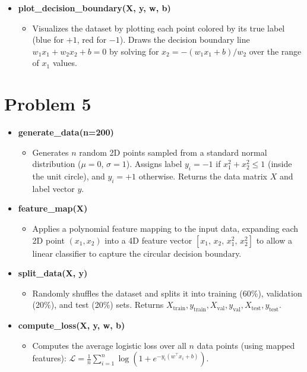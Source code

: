 \documentclass[12pt,fleqn]{article}
\begin{document}
\begin{itemize}
  \item \textbf{plot\_decision\_boundary(X, y, w, b)}
  \begin{itemize}
    \item Visualizes the dataset by plotting each point colored by its true label (blue for $+1$, red for $-1$). Draws the decision boundary line $w_1 x_1 + w_2 x_2 + b = 0$ by solving for $x_2 = -(w_1 x_1 + b)/w_2$ over the range of $x_1$ values.
  \end{itemize}
\end{itemize}

\newpage
\section*{Problem 5}

\begin{itemize}
  \item \textbf{generate\_data(n=200)}
  \begin{itemize}
    \item Generates $n$ random 2D points sampled from a standard normal distribution ($\mu=0$, $\sigma=1$). Assigns label $y_i = -1$ if $x_1^2 + x_2^2 \leq 1$ (inside the unit circle), and $y_i = +1$ otherwise. Returns the data matrix $X$ and label vector $y$.
  \end{itemize}

  \item \textbf{feature\_map(X)}
  \begin{itemize}
    \item Applies a polynomial feature mapping to the input data, expanding each 2D point $(x_1, x_2)$ into a 4D feature vector $[x_1,\, x_2,\, x_1^2,\, x_2^2]$ to allow a linear classifier to capture the circular decision boundary.
  \end{itemize}

  \item \textbf{split\_data(X, y)}
  \begin{itemize}
    \item Randomly shuffles the dataset and splits it into training (60\%), validation (20\%), and test (20\%) sets. Returns $X_{\text{train}}, y_{\text{train}}, X_{\text{val}}, y_{\text{val}}, X_{\text{test}}, y_{\text{test}}$.
  \end{itemize}

  \item \textbf{compute\_loss(X, y, w, b)}
  \begin{itemize}
    \item Computes the average logistic loss over all $n$ data points (using mapped features):
    $\mathcal{L} = \frac{1}{n}\sum_{i=1}^{n} \log(1 + e^{-y_i(w^\top x_i + b)})$.
  \end{itemize}


\end{itemize}
\end{document}
